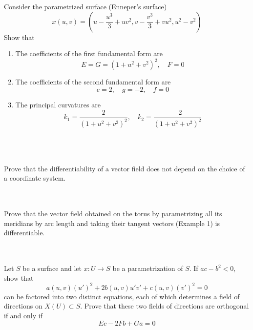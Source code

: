 \documentclass[12pt,letterpaper]{hmcpset}
\begin{document}
\begin{problem}
\\ \\
Consider the parametrized surface (Enneper’s surface)  
$$x(u,v) = \left(u-\frac{u^3}{3}+ uv^2,v-\frac{v^3}{3}+ vu^2, u^2-v^2 \right)$$
Show that 
\begin{enumerate}
    \item The coefficients of the first fundamental form are
    $$E=G=(1+u^2+v^2)^2, \quad F=0$$
    \item The coefficients of the second fundamental form are 
    $$e = 2,\quad g=-2,\quad f=0$$
    \item The principal curvatures are  
    $$k_1 = \frac{2}{(1+u^2+v^2)^2}, \quad k_2 = \frac{-2}{(1+u^2+v^2)^2}$$\\
\end{enumerate}
\end{problem}
\begin{solution}
\end{solution}

\begin{problem}
\\ \\
Prove that the differentiability of a vector field does not depend on the choice of a coordinate system.\\
\end{problem}
\begin{solution}
\end{solution}

\begin{problem}
\\ \\
Prove that the vector field obtained on the torus by parametrizing all its meridians by arc length and taking their tangent vectors (Example 1) is differentiable.\\
\end{problem}
\begin{solution}
\end{solution}

\begin{problem}
\\ \\
Let $S$ be a surface and let $x:U\to S$ be a parametrization of $S$. If $ac-b^2 <0$, show that 
$$a(u,v)(u')^2+2b(u,v)u'v'+c(u,v)(v')^2=0$$
can be factored into two distinct equations, each of which determines a field of directions on $X(U)\subset S$. Prove that these two fields of directions are orthogonal if and only if 
$$Ec-2Fb+Ga = 0$$\\
\end{problem}
\begin{solution}
\end{solution}
\end{document}
